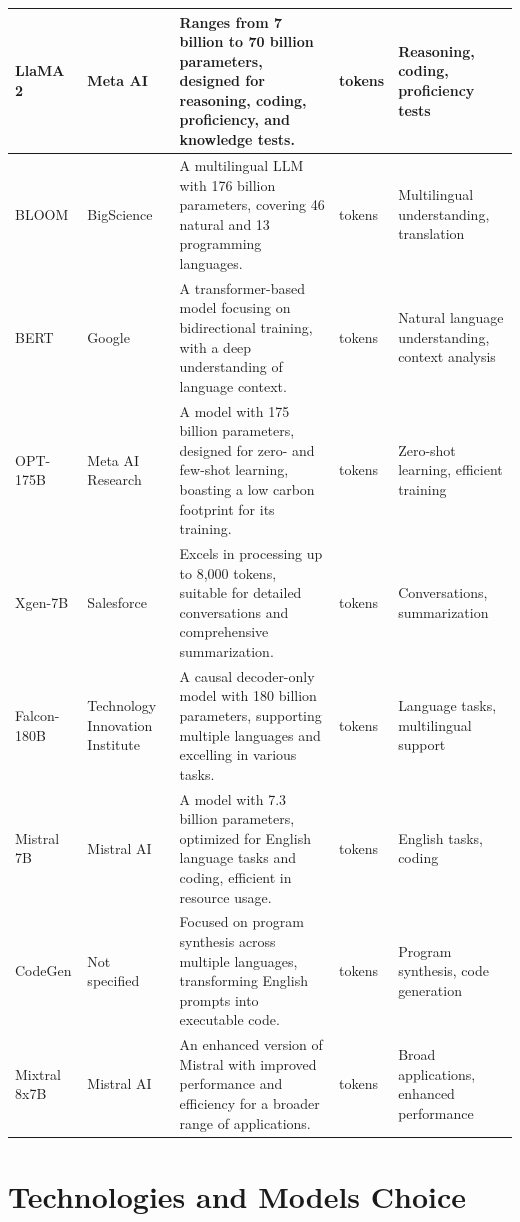\begin{longtable}{|>{\centering\arraybackslash}p{2.5cm}|>{\centering\arraybackslash}p{2cm}|>{\centering\arraybackslash}p{4cm}|>{\centering\arraybackslash}p{2.5cm}|>{\centering\arraybackslash}p{2.5cm}|}
    LlaMA 2 & Meta AI & Ranges from 7 billion to 70 billion parameters, designed for reasoning, coding, proficiency, and knowledge tests. & 4096 tokens & Reasoning, coding, proficiency tests \\
    \hline
    BLOOM & BigScience & A multilingual LLM with 176 billion parameters, covering 46 natural and 13 programming languages. & 2048 tokens & Multilingual understanding, translation \\
    \hline
    BERT & Google & A transformer-based model focusing on bidirectional training, with a deep understanding of language context. & 512 tokens & Natural language understanding, context analysis \\
    \hline
    OPT-175B & Meta AI Research & A model with 175 billion parameters, designed for zero- and few-shot learning, boasting a low carbon footprint for its training. & 2048 tokens & Zero-shot learning, efficient training \\
    \hline
    Xgen-7B & Salesforce & Excels in processing up to 8,000 tokens, suitable for detailed conversations and comprehensive summarization. & 8000 tokens & Conversations, summarization \\
    \hline
    Falcon-180B & Technology Innovation Institute & A causal decoder-only model with 180 billion parameters, supporting multiple languages and excelling in various tasks. & 2048 tokens & Language tasks, multilingual support \\
    \hline
    Mistral 7B & Mistral AI & A model with 7.3 billion parameters, optimized for English language tasks and coding, efficient in resource usage. & 4096 tokens & English tasks, coding \\
    \hline
    CodeGen & Not specified & Focused on program synthesis across multiple languages, transforming English prompts into executable code. & 2048 tokens & Program synthesis, code generation \\
    \hline
    Mixtral 8x7B & Mistral AI & An enhanced version of Mistral with improved performance and efficiency for a broader range of applications. & 4096 tokens & Broad applications, enhanced performance \\
    \hline
    \end{longtable}
    




\section{Technologies and Models Choice}
